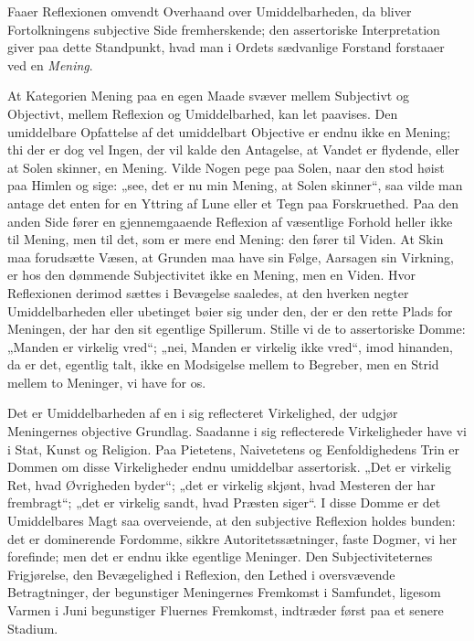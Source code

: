 \documentclass[12pt]{book}
\newcommand{\opage}[1]{\marginnote{\footnotesize\textit{[#1]}}}
\begin{document}
Faaer Reflexionen omvendt Overhaand over Umiddelbarheden,
da bliver Fortolkningens subjective Side fremherskende;
den assertoriske Interpretation giver paa dette Standpunkt,
hvad man i Ordets sædvanlige Forstand forstaaer ved
en \emph{Mening}.

At Kategorien Mening paa en egen Maade svæver
mellem Subjectivt og Objectivt, mellem Reflexion og Umiddelbarhed,
kan let paavises. Den umiddelbare Opfattelse af
det umiddelbart Objective er endnu ikke en Mening; thi der
er dog vel Ingen, der vil kalde den Antagelse, at Vandet er
flydende, eller at Solen skinner, en Mening. Vilde Nogen
pege paa Solen, naar den stod høist paa Himlen og sige: „see,
det er nu min Mening, at Solen skinner“, saa vilde man
antage det enten for en Yttring af Lune eller et Tegn paa
Forskruethed. Paa den anden Side fører en gjennemgaaende
Reflexion af væsentlige Forhold heller ikke til Mening, men
til det, som er mere end Mening: den fører til Viden. At
Skin maa forudsætte Væsen, at Grunden maa have sin Følge,
Aarsagen sin Virkning, er hos den dømmende Subjectivitet
ikke en Mening, men en Viden. Hvor Reflexionen derimod
sættes i Bevægelse saaledes, at den hverken negter Umiddelbarheden
eller ubetinget bøier sig under den, der er den rette
Plads for Meningen, der har den sit egentlige Spillerum.
\opage{195}Stille vi de to assertoriske Domme: „Manden er virkelig
vred“; „nei, Manden er virkelig ikke vred“, imod hinanden,
da er det, egentlig talt, ikke en Modsigelse mellem to Begreber,
men en Strid mellem to Meninger, vi have for os.

Det er Umiddelbarheden af en i sig reflecteret Virkelighed,
der udgjør Meningernes objective Grundlag. Saadanne
i sig reflecterede Virkeligheder have vi i Stat, Kunst og Religion.
Paa Pietetens, Naivetetens og Eenfoldighedens Trin
er Dommen om disse Virkeligheder endnu umiddelbar assertorisk.
„Det er virkelig Ret, hvad Øvrigheden byder“; „det
er virkelig skjønt, hvad Mesteren der har frembragt“; „det er
virkelig sandt, hvad Præsten siger“. I disse Domme er
det Umiddelbares Magt saa overveiende, at den subjective
Reflexion holdes bunden: det er dominerende Fordomme,
sikkre Autoritetssætninger, faste Dogmer, vi her forefinde; men
det er endnu ikke egentlige Meninger. Den Subjectiviteternes
Frigjørelse, den Bevægelighed i Reflexion, den Lethed i oversvævende
Betragtninger, der begunstiger Meningernes Fremkomst
i Samfundet, ligesom Varmen i Juni begunstiger Fluernes
Fremkomst, indtræder først paa et senere Stadium.
\end{document}
